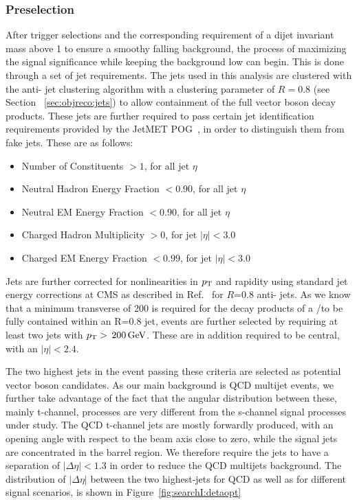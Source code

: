 \subsubsection{Preselection} 
After trigger selections and the corresponding requirement of a dijet invariant mass above 1 \TeV to ensure a smoothy falling background, the process of maximizing the signal significance while keeping the background low can begin. This is done through a set of jet requirements. The jets used in this analysis are clustered with the anti-\kt{} jet clustering algorithm with a clustering parameter of $R=0.8$ (see Section ~\ref{sec:objreco:jets}) to allow containment of the full vector boson decay products. These jets are further required to pass certain jet identification requirements provided by the JetMET POG~\cite{jetID_JME}, in order to distinguish them from fake jets. These are as follows:
\begin{itemize}
\item Number of Constituents $> 1$, for all jet $\eta$
\item Neutral Hadron Energy Fraction $< 0.90$, for all jet $\eta$
\item Neutral EM Energy Fraction $< 0.90$, for all jet $\eta$
\item Charged Hadron Multiplicity $> 0$, for jet $|\eta| < 3.0$
\item Charged EM Energy Fraction $< 0.99$, for jet $|\eta| < 3.0$
\end{itemize} 
Jets are further corrected for nonlinearities in $p_{\mathrm{T}}$ and rapidity using standard jet energy corrections at CMS as described in Ref.~\cite{jme_jinst} for $R$=0.8 anti-\kt{} jets.
As we know that a minimum transverse of 200 \GeV is required for the decay products of a \PW/\PZ to be fully contained within an R=0.8 jet, events are further selected by requiring at least two jets with $p_{\mathrm{T}} > \text{\,200}{\ensuremath{\,\text{Ge\hspace{-.08em}V}}}$. These are in addition required to be central, with an $|\eta| < 2.4$. \par
The two highest \PT jets in the event passing these criteria are selected as potential vector boson candidates.
As our main background is QCD multijet events, we further take advantage of the fact that the angular distribution between these, mainly t-channel, processes are very different from the s-channel signal processes under study. The QCD t-channel jets are mostly forwardly produced, with an opening angle with respect to the beam axis close to zero, while the signal jets are concentrated in the barrel region. We therefore require the jets to have a separation of $|\Delta\eta|<1.3$ in order to reduce the QCD multijets background.
The distribution of $|\Delta\eta|$ between the two highest-\PT jets for QCD as well as for different signal scenarios, is shown in Figure~\ref{fig:searchI:detaopt}

